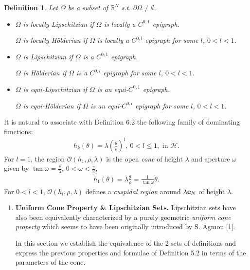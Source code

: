 \documentclass{book}
\numberwithin{equation}{section}
\newtheorem{definition}{Definition}[section]
\begin{document}
\begin{enumerate}
    \begin{definition}
        Let $\Omega$ be a subset of $\mathbb{R}^N$ s.t. $\partial\Omega\ne\emptyset$.
        \begin{itemize}
            \item[(i)] $\Omega$ is \emph{locally Lipschitzian} if $\Omega$ is \emph{locally a $C^{0,1}$ epigraph}.
            
            $\Omega$ is \emph{locally Hölderian} if $\Omega$ is \emph{locally a $C^{0,l}$ epigraph} for some $l$, $0 < l < 1$.
            \item[(ii)] $\Omega$ is \emph{Lipschitzian} if $\Omega$ is a \emph{$C^{0,1}$ epigraph}.
            
            $\Omega$ is \emph{Hölderian} if $\Omega$ is \emph{a $C^{0,l}$ epigraph} for some $l$, $0 < l < 1$.
            \item[(iii)] $\Omega$ is \emph{equi-Lipschitzian} if $\Omega$ is \emph{an equi-$C^{0,1}$ epigraph}.
            
            $\Omega$ is \emph{equi-Hölderian} if $\Omega$ is \emph{an equi-$C^{0,l}$ epigraph} for some $l$, $0 < l < 1$.
        \end{itemize}
    \end{definition}
    It is natural to associate with Definition 6.2 the following family of dominating functions:
    \begin{align*}
        h_k(\theta) = \lambda\left(\frac{\theta}{\rho}\right)^l,\ 0 < l\le 1, \mbox{ in } \mathcal{H}.
    \end{align*}
    For $l = 1$, the region $\mathcal{O}(h_1,\rho,\lambda)$ is the open \textit{cone} of height $\lambda$ and aperture $\omega$ given by $\tan\omega = \frac{\rho}{\lambda}$, $0 < \omega < \frac{\pi}{2}$,
    \begin{align*}
        h_1(\theta) = \lambda\frac{\theta}{\rho} = \frac{1}{\tan\omega}\theta.
    \end{align*}
    For $0 < l < 1$, $\mathcal{O}(h_l,\rho,\lambda)$ defines a \textit{cuspidal region} around $\lambda {\bf e}_N$ of height $\lambda$.
    \begin{enumerate}
        \item \textbf{Uniform Cone Property \& Lipschitzian Sets.} Lipschitzian sets have also been equivalently characterized by a purely geometric \textit{uniform cone property} which seems to have been originally introduced by S. Agmon [1].
        
        In this section we establish the equivalence of the 2 sets of definitions and express the previous properties and formulae of Definition 5.2 in terms of the parameters of the cone.
        

\end{enumerate}
\end{enumerate}
\end{document}
